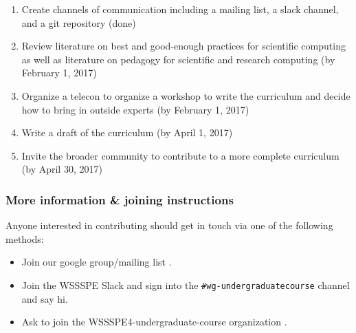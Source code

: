 \begin{enumerate}
\item Create channels of communication including a mailing list, a
  slack channel, and a git repository (done)
\item Review literature on best and good-enough practices for
  scientific computing as well as literature on pedagogy for
  scientific and research computing (by February 1, 2017)
\item Organize a telecon to organize a workshop to write the
  curriculum and decide how to bring in outside experts (by February 1,
  2017)
\item Write a draft of the curriculum (by April 1, 2017)
\item Invite the broader community to contribute to a more complete
  curriculum (by April 30, 2017)
\end{enumerate}

\subsubsection{More information \& joining instructions}

Anyone interested in contributing should get in touch via one of the
following methods:

\begin{itemize}
\item Join our google group/mailing list
  \cite{WSSSPEUndergradGoogleGroup}.
\item Join the WSSSPE Slack \cite{WSSSPESlack} and sign into the
  \texttt{\#wg-undergraduatecourse} channel and say hi.
\item Ask to join the WSSSPE4-undergraduate-course organization
  \cite{WSSSPEUndergradGithub}.
\end{itemize}